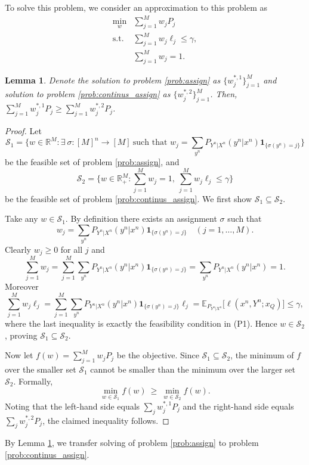\documentclass{article} %
\theoremstyle{plain} %
\newtheorem{lemma}[theorem]{Lemma}          %
\begin{document}
To solve this problem, we consider an approximation to this problem as
\begin{align*}\label{prob:continus_assign}
\min_{w} & \sum_{j=1}^M  w_j {P}_{j}  \tag*{(P2)}\\
\text{s.t.}& \sum_{j=1}^M w_j\ell_{j} \leq \gamma,\\
& \sum_{j=1}^M w_j = 1.
\end{align*}

\begin{lemma}\label{lem:dis_2_con}
Denote the solution to problem \ref{prob:assign} as $\{w^{\ast,1}_j\}_{j=1}^M$ and solution to problem \ref{prob:continus_assign} as $\{w^{\ast,2}_j\}_{j=1}^M$. Then, $\sum_{j=1}^M w^{\ast,1}_j P_j \geq \sum_{j=1}^M w^{\ast,2}_j P_j$.
\end{lemma}
\begin{proof}
Let
\[
\mathcal{S}_1=\Big\{w\in\mathbb{R}^M:\exists\ \sigma:[M]^n\to[M]\ \text{such that } w_j=\sum_{y^n}P_{Y^n|X^n}(y^n|x^n)\mathbf{1}_{\{\sigma(y^n)=j\}}\Big\}
\]
be the feasible set of problem \ref{prob:assign}, and
\[
\mathcal{S}_2=\Big\{w\in\mathbb{R}_+^M:\sum_{j=1}^M w_j=1,\ \sum_{j=1}^M w_j\ell_j\le\gamma\Big\}
\]
be the feasible set of problem \ref{prob:continus_assign}. We first show $\mathcal{S}_1\subseteq\mathcal{S}_2$.

Take any $w\in\mathcal{S}_1$. By definition there exists an assignment $\sigma$ such that
\[
w_j=\sum_{y^n}P_{Y^n|X^n}(y^n|x^n)\mathbf{1}_{\{\sigma(y^n)=j\}}\quad (j=1,\dots,M).
\]
Clearly $w_j\ge0$ for all $j$ and
\[
\sum_{j=1}^M w_j=\sum_{j=1}^M\sum_{y^n}P_{Y^n|X^n}(y^n|x^n)\mathbf{1}_{\{\sigma(y^n)=j\}}
=\sum_{y^n}P_{Y^n|X^n}(y^n|x^n)=1.
\]
Moreover
\[
\sum_{j=1}^M w_j\ell_j
=\sum_{j=1}^M\sum_{y^n}P_{Y^n|X^n}(y^n|x^n)\mathbf{1}_{\{\sigma(y^n)=j\}}\ell_j
=\mathbb{E}_{P_{Y^n|X^n}}\big[\ell(x^n,Y^n;x_Q)\big]\le\gamma,
\]
where the last inequality is exactly the feasibility condition in (P1). Hence $w\in\mathcal{S}_2$, proving $\mathcal{S}_1\subseteq\mathcal{S}_2$.

Now let $f(w)=\sum_{j=1}^M w_j P_j$ be the objective. Since $\mathcal{S}_1\subseteq\mathcal{S}_2$, the minimum of $f$ over the smaller set $\mathcal{S}_1$ cannot be smaller than the minimum over the larger set $\mathcal{S}_2$. Formally,
\[
\min_{w\in\mathcal{S}_1} f(w)\ \ge\ \min_{w\in\mathcal{S}_2} f(w).
\]
Noting that the left-hand side equals $\sum_{j} w^{\ast,1}_j P_j$ and the right-hand side equals $\sum_{j} w^{\ast,2}_j P_j$, the claimed inequality follows.
\end{proof}
By Lemma \ref{lem:dis_2_con}, we transfer solving of problem \ref{prob:assign} to problem \ref{prob:continus_assign}. 
\end{document}
